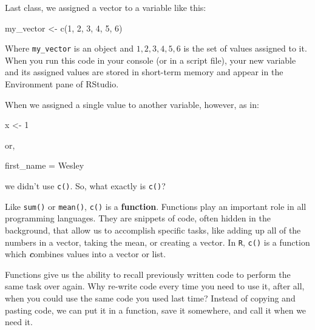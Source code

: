 \documentclass[
  letterpaper,
]{book}
\newenvironment{Shaded}{\begin{snugshade}}{\end{snugshade}}
\newcommand{\DecValTok}[1]{\textcolor[rgb]{0.68,0.00,0.00}{#1}}
\newcommand{\FunctionTok}[1]{\textcolor[rgb]{0.28,0.35,0.67}{#1}}
\newcommand{\NormalTok}[1]{\textcolor[rgb]{0.00,0.23,0.31}{#1}}
\newcommand{\OtherTok}[1]{\textcolor[rgb]{0.00,0.23,0.31}{#1}}
\newcommand{\StringTok}[1]{\textcolor[rgb]{0.13,0.47,0.30}{#1}}
\begin{document}
Last class, we assigned a vector to a variable like this:

\begin{Shaded}
\begin{Highlighting}[]
\NormalTok{my\_vector }\OtherTok{\textless{}{-}} \FunctionTok{c}\NormalTok{(}\DecValTok{1}\NormalTok{, }\DecValTok{2}\NormalTok{, }\DecValTok{3}\NormalTok{, }\DecValTok{4}\NormalTok{, }\DecValTok{5}\NormalTok{, }\DecValTok{6}\NormalTok{)}
\end{Highlighting}
\end{Shaded}

Where \texttt{my\_vector} is an object and \({1,2,3,4,5,6}\) is the set
of values assigned to it. When you run this code in your console (or in
a script file), your new variable and its assigned values are stored in
short-term memory and appear in the Environment pane of RStudio.

When we assigned a single value to another variable, however, as in:

\begin{Shaded}
\begin{Highlighting}[]
\NormalTok{x }\OtherTok{\textless{}{-}} \DecValTok{1}
\end{Highlighting}
\end{Shaded}

or,

\begin{Shaded}
\begin{Highlighting}[]
\NormalTok{first\_name }\OtherTok{=} \StringTok{\textquotesingle{}Wesley\textquotesingle{}}
\end{Highlighting}
\end{Shaded}

we didn't use \texttt{c()}. So, what exactly is \texttt{c()}?

Like \texttt{sum()} or \texttt{mean()}, \texttt{c()} is a
\textbf{function}. Functions play an important role in all programming
languages. They are snippets of code, often hidden in the background,
that allow us to accomplish specific tasks, like adding up all of the
numbers in a vector, taking the mean, or creating a vector. In
\texttt{R}, \texttt{c()} is a function which \textbf{\emph{c}}ombines
values into a vector or list.

Functions give us the ability to recall previously written code to
perform the same task over again. Why re-write code every time you need
to use it, after all, when you could use the same code you used last
time? Instead of copying and pasting code, we can put it in a function,
save it somewhere, and call it when we need it.
\end{document}
